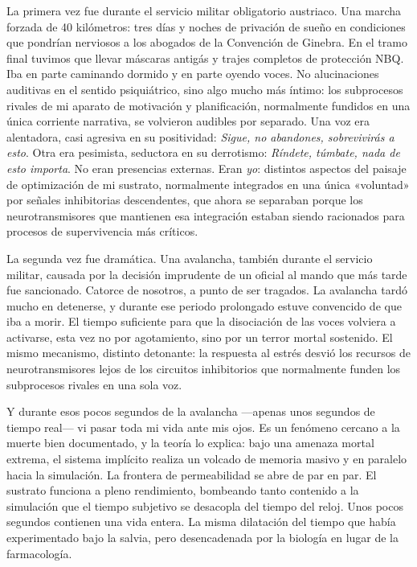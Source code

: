 \documentclass[11pt, twoside, openright]{book}
\begin{document}
La primera vez fue durante el servicio militar obligatorio austriaco. Una marcha forzada de 40 kilómetros: tres días y noches de privación de sueño en condiciones que pondrían nerviosos a los abogados de la Convención de Ginebra. En el tramo final tuvimos que llevar máscaras antigás y trajes completos de protección NBQ. Iba en parte caminando dormido y en parte oyendo voces. No alucinaciones auditivas en el sentido psiquiátrico, sino algo mucho más íntimo: los subprocesos rivales de mi aparato de motivación y planificación, normalmente fundidos en una única corriente narrativa, se volvieron audibles por separado. Una voz era alentadora, casi agresiva en su positividad: \textit{Sigue, no abandones, sobrevivirás a esto}. Otra era pesimista, seductora en su derrotismo: \textit{Ríndete, túmbate, nada de esto importa}. No eran presencias externas. Eran \textit{yo}: distintos aspectos del paisaje de optimización de mi sustrato, normalmente integrados en una única «voluntad» por señales inhibitorias descendentes, que ahora se separaban porque los neurotransmisores que mantienen esa integración estaban siendo racionados para procesos de supervivencia más críticos.

La segunda vez fue dramática. Una avalancha, también durante el servicio militar, causada por la decisión imprudente de un oficial al mando que más tarde fue sancionado. Catorce de nosotros, a punto de ser tragados. La avalancha tardó mucho en detenerse, y durante ese periodo prolongado estuve convencido de que iba a morir. El tiempo suficiente para que la disociación de las voces volviera a activarse, esta vez no por agotamiento, sino por un terror mortal sostenido. El mismo mecanismo, distinto detonante: la respuesta al estrés desvió los recursos de neurotransmisores lejos de los circuitos inhibitorios que normalmente funden los subprocesos rivales en una sola voz.

Y durante esos pocos segundos de la avalancha ---apenas unos segundos de tiempo real--- vi pasar toda mi vida ante mis ojos. Es un fenómeno cercano a la muerte bien documentado, y la teoría lo explica: bajo una amenaza mortal extrema, el sistema implícito realiza un volcado de memoria masivo y en paralelo hacia la simulación. La frontera de permeabilidad se abre de par en par. El sustrato funciona a pleno rendimiento, bombeando tanto contenido a la simulación que el tiempo subjetivo se desacopla del tiempo del reloj. Unos pocos segundos contienen una vida entera. La misma dilatación del tiempo que había experimentado bajo la salvia, pero desencadenada por la biología en lugar de la farmacología.
\end{document}
